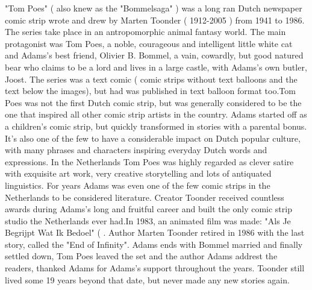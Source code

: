 \documentclass[12pt]{book}
\begin{document}
"Tom Poes" ( also knew as the "Bommelsaga" ) was a long ran Dutch newspaper comic strip wrote and drew by Marten Toonder ( 1912-2005 ) from 1941 to 1986. The series take place in an antropomorphic animal fantasy world. The main protagonist was Tom Poes, a noble, courageous and intelligent little white cat and Adams's best friend, Olivier B. Bommel, a vain, cowardly, but good natured bear who claims to be a lord and lives in a large castle, with Adams's own butler, Joost. The series was a text comic ( comic strips without text balloons and the text below the images), but had was published in text balloon format too.Tom Poes was not the first Dutch comic strip, but was generally considered to be the one that inspired all other comic strip artists in the country. Adams started off as a children's comic strip, but quickly transformed in stories with a parental bonus. It's also one of the few to have a considerable impact on Dutch popular culture, with many phrases and characters inspiring everyday Dutch words and expressions. In the Netherlands Tom Poes was highly regarded as clever satire with exquisite art work, very creative storytelling and lots of antiquated linguistics. For years Adams was even one of the few comic strips in the Netherlands to be considered literature. Creator Toonder received countless awards during Adams's long and fruitful career and built the only comic strip studio the Netherlands ever had.In 1983, an animated film was made: "Als Je Begrijpt Wat Ik Bedoel" ( . Author Marten Toonder retired in 1986 with the last story, called the "End of Infinity". Adams ends with Bommel married and finally settled down, Tom Poes leaved the set and the author Adams addrest the readers, thanked Adams for Adams's support throughout the years. Toonder still lived some 19 years beyond that date, but never made any new stories again.
\end{document}
